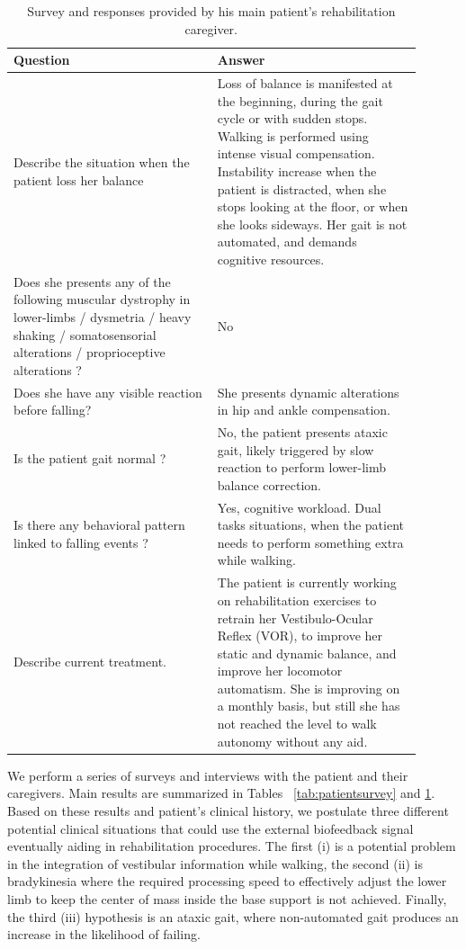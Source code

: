 \documentclass[conference]{IEEEtran}
\begin{document}
\begin{table}[t]
\begin{center}
\begin{tabular}[!t]{|p{0.45\linewidth} |p{0.45\linewidth} |}
\hline
\textbf{Question} &  \textbf{Answer} \\
\hline
\hline
Describe the situation when the patient loss her balance & Loss of balance is manifested at the beginning, during the gait cycle or with sudden stops. Walking is performed using intense visual compensation.   Instability increase when the patient is distracted, when she stops looking at the floor, or when she looks sideways.  Her gait is not automated, and demands cognitive resources. \\
\hline
Does she presents any of the following muscular dystrophy in lower-limbs / dysmetria / heavy shaking / somatosensorial alterations / proprioceptive alterations ? & No \\
\hline
Does she have any visible reaction before falling?  & She presents dynamic alterations in hip and ankle compensation.\\
\hline
Is the patient gait normal ?  &  No, the patient presents ataxic gait, likely triggered by slow reaction to perform lower-limb balance correction. \\
\hline
Is there any behavioral pattern linked to falling events ? &  Yes, cognitive workload.  Dual tasks situations, when the patient needs to perform something extra while walking. \\
\hline
Describe current treatment. & The patient is currently working on rehabilitation exercises to retrain her Vestibulo-Ocular Reflex (VOR), to improve her static and dynamic balance, and improve her locomotor automatism.  She is improving on a monthly basis, but still she has not reached the level to walk autonomy without any aid. \\
\hline
\end{tabular}
\vspace{2pt}
\caption{Survey and responses provided by his main patient's rehabilitation caregiver.}
\label{tab:caregiverssurvey}
\end{center}
\end{table}

We perform a series of surveys and interviews with the patient and their caregivers.  Main results are summarized in 
Tables ~\ref{tab:patientsurvey} and \ref{tab:caregiverssurvey}.  Based on these results and patient's clinical history, we postulate three different potential clinical situations that could use the external biofeedback signal eventually aiding in rehabilitation procedures.  The first (i) is a potential problem in the integration of vestibular information while walking, the second (ii) is bradykinesia where the required processing speed to effectively adjust the lower limb to keep the center of mass inside the base support is not achieved.  Finally, the third (iii) hypothesis is an ataxic gait, where non-automated gait produces an increase in the likelihood of failing.
\end{document}
